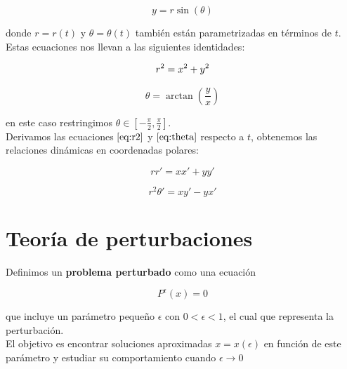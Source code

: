 \documentclass[12pt, a4paper]{report}
\begin{document}
\begin{equation}\label{eq:ypolar}
	y=r\sin(\theta)
\end{equation}

donde $r=r(t)$ y $\theta=\theta(t)$ también están parametrizadas en términos de $t$.\\

Estas ecuaciones nos llevan a las siguientes identidades:

\begin{equation}\label{eq:r2}
	r^2=x^2+y^2\\
\end{equation}

\begin{equation}\label{eq:theta}
	\theta=\arctan{(\frac{y}{x})}
\end{equation}

en este caso restringimos $\theta\in\left[-\frac{\pi}{2},\frac{\pi}{2}\right]$.\\

Derivamos las ecuaciones $\eqref{eq:r2}$ y $\eqref{eq:theta}$ respecto a $t$, obtenemos las relaciones dinámicas en coordenadas polares:

\begin{equation}\label{eq:drcart}
	rr'=xx'+yy'
\end{equation}

\begin{equation}\label{eq:dthetacart}
	r^2\theta'=xy'-yx'
\end{equation}

\newpage

\section{Teoría de perturbaciones}

Definimos un \textbf{problema perturbado} como una ecuación 

\begin{equation}\label{eq: problemaPerturbado}
	P^\epsilon\left(x\right)=0
\end{equation}

que incluye un parámetro pequeño $\epsilon$ con $0<\epsilon<1$, el cual que representa la perturbación.\\

El objetivo es encontrar soluciones aproximadas $x=x\left(\epsilon\right)$ en función de este parámetro y estudiar su comportamiento cuando $\epsilon\to0$\\
\end{document}
